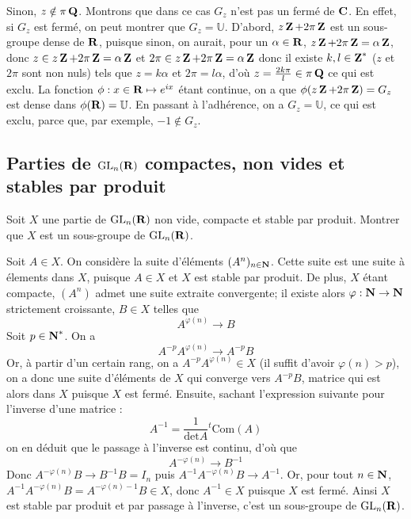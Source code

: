 \begin{correction}
Sinon, $z\notin\pi\operatorname{\mathbf{Q}}$. Montrons que dans ce cas $G_z$ n'est pas un fermé de $\operatorname{\mathbf{C}}$. En effet, si $G_z$ est fermé, on peut montrer que $G_z=\mathbb U$. D'abord, $z\operatorname{\mathbf{Z}}+2\pi\operatorname{\mathbf{Z}}$ est un sous-groupe dense de $\operatorname{\mathbf{R}}$, puisque sinon, on aurait, pour un $\alpha\in\operatorname{\mathbf{R}}$, $z\operatorname{\mathbf{Z}}+2\pi\operatorname{\mathbf{Z}}=\alpha\operatorname{\mathbf{Z}}$, donc $z\in z\operatorname{\mathbf{Z}}+2\pi\operatorname{\mathbf{Z}}=\alpha\operatorname{\mathbf{Z}}$ et $2\pi\in z\operatorname{\mathbf{Z}}+2\pi\operatorname{\mathbf{Z}}=\alpha\operatorname{\mathbf{Z}}$ donc il existe $k,l\in\operatorname{\mathbf{Z}}^*$ ($z$ et $2\pi$ sont non nuls) tels que $z=k\alpha$ et $2\pi=l\alpha$, d'où $z=\frac{2k\pi}l\in\pi\operatorname{\mathbf{Q}}$ ce qui est exclu. La fonction $\phi:x\in\operatorname{\mathbf{R}}\mapsto e^{ix}$ étant continue, on a que $\phi(z\operatorname{\mathbf{Z}}+2\pi\operatorname{\mathbf{Z}})=G_z$ est dense dans $\phi(\operatorname{\mathbf{R}})=\mathbb U$. En passant à l'adhérence, on a $G_z=\mathbb U$, ce qui est exclu, parce que, par exemple, $-1\notin G_z$.
\end{correction}

\subsection{Parties de $\operatorname{\mathrm{GL}}_n(\operatorname{\mathbf{R}})$ compactes, non vides et stables par produit} 

\begin{exercice}
    Soit $X$ une partie de $\operatorname{\mathrm{GL}}_n(\operatorname{\mathbf{R}})$ non vide, compacte et stable par produit. Montrer que $X$ est un sous-groupe de $\operatorname{\mathrm{GL}}_n(\operatorname{\mathbf{R}})$.
\end{exercice}

\begin{correction}
    Soit $A\in X$. On considère la suite d'éléments $(A^n)_{n\in\operatorname{\mathbf{N}}}$. Cette suite est une suite à élements dans $X$, puisque $A\in X$ et $X$ est stable par produit. De plus, $X$ étant compacte, $(A^n)$ admet une suite extraite convergente; il existe alors $\varphi : \operatorname{\mathbf{N}}\to\operatorname{\mathbf{N}}$ strictement croissante, $B\in X$ telles que \[A^{\varphi(n)}\longrightarrow B\]
    Soit $p\in\operatorname{\mathbf{N}}^*$. On a \[A^{-p}A^{\varphi(n)}\longrightarrow A^{-p}B\]
    Or, à partir d'un certain rang, on a $A^{-p}A^{\varphi(n)}\in X$ (il suffit d'avoir $\varphi(n)>p$), on a donc une suite d'éléments de $X$ qui converge vers $A^{-p}B$, matrice qui est alors dans $X$ puisque $X$ est fermé. Ensuite, sachant l'expression suivante pour l'inverse d'une matrice : \[A^{-1}=\frac1{\text{det}A}{}^t\text{Com}(A)\]
    on en déduit que le passage à l'inverse est continu, d'où que \[A^{-\varphi(n)}\longrightarrow B^{-1}\]
    Donc $A^{-\varphi(n)}B\longrightarrow B^{-1}B=I_n$ puis $A^{-1}A^{-\varphi(n)}B\longrightarrow A^{-1}$. Or, pour tout $n\in\operatorname{\mathbf{N}}$, $A^{-1}A^{-\varphi(n)}B=A^{-\varphi(n)-1}B\in X$, donc $A^{-1}\in X$ puisque $X$ est fermé. Ainsi $X$ est stable par produit et par passage à l'inverse, c'est un sous-groupe de $\operatorname{\mathrm{GL}}_n(\operatorname{\mathbf{R}})$.
\end{correction}
    

